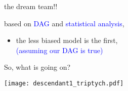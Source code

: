 %
%
\begin{lhframe}[rhgraphic={\texttt{[image: descendant1\_reg1.png]}}]
	{the dream team!!}
	
	based on \textcolor{blue}{DAG} and \textcolor{blue}{statistical analysis},
	\begin{itemize}
		\item the less biased model is the first, \\
		{\small \textcolor{blue}{(assuming our DAG is true)} }
	\end{itemize}
\end{lhframe}
%
%
\begin{frame}
	{So, what is going on?}
	
	\begin{figure*}
		\texttt{[image: descendant1\_triptych.pdf]}
	\end{figure*}
\end{frame}
%
%
